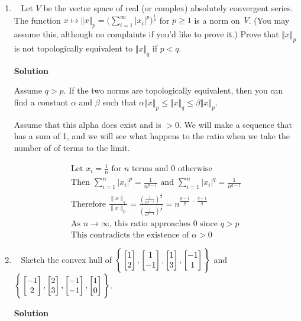 \documentclass[11pt]{article}
\makeatletter
\newcommand\score[1]{\marginpar{\vspace{-2ex}\color{blue}{#1/3}}\hspace{-1ex}}
\newcommand\0{\mathbf{0}}
\newcommand\<{\langle}
\renewcommand\>{\rangle}
\newcommand\tworow[1]{\left[\begin{array}{@{}c@{}}#1\end{array}\right]}
\makeatother
\begin{document}
\begin{enumerate}
\item\ \score{}%
Let $V$ be the vector space of real (or complex) absolutely convergent
series.  The function $x \mapsto \Vert x \Vert_p =
\big(\sum_{i=1}^\infty |x_i|^p\big){}^{\frac 1p}$ for $p \geq 1$ is a
norm on~$V$.  (You may assume this, although no complaints if you'd
like to prove it.)  Prove that $\Vert x \Vert_p$ is not topologically
equivalent to $\Vert x \Vert_q$ if $p < q$.

\textbf{Solution}

Assume $q>p$. If the two norms are topologically equivalent, then you can find a constant $\alpha$ and $\beta$ such 
that $\alpha \Vert x \Vert_p \leq \Vert x \Vert_q \leq \beta \Vert x \Vert_p$.

Assume that this alpha does exist and is $>0$. We will make a sequence that 
has a sum of 1, and we will see what happens to the ratio when we take the number of
of terms to the limit.

\begin{align*}
  \text{Let } x_i = \frac{1}{n} \text{ for } n \text{ terms and } 0 \text{ otherwise}\\
  \text{Then } \sum_{i=1}^n |x_i|^p = \frac{1}{n^{p-1}} \text{ and } \sum_{i=1}^n |x_i|^q = \frac{1}{n^{q-1}}\\
  \text{Therefore } \frac{\|x\|_q}{\|x\|_p} = \frac{(\frac{1}{n^{q-1}})^{\frac{1}{q}}}{(\frac{1}{n^{p-1}})^{\frac{1}{p}}} = n^{\frac{p-1}{p} - \frac{q-1}{q}}\\
  \text{As } n \to \infty \text{, this ratio approaches } 0 \text{ since } q > p\\
  \text{This contradicts the existence of } \alpha > 0
\end{align*}

\pagebreak

\item\ \score{}%
Sketch the convex hull of
$\Bigg\{\tworow{1\\2},\tworow{1\\-1},\tworow{1\\3},\tworow{-1\\1}\Bigg\}$
and
$\Bigg\{\tworow{-1\\2},\tworow{2\\3},\tworow{-1\\-1},\tworow{1\\0}\Bigg\}$.

\textbf{Solution}

\begin{center}
\end{center}
\end{enumerate}
\end{document}
